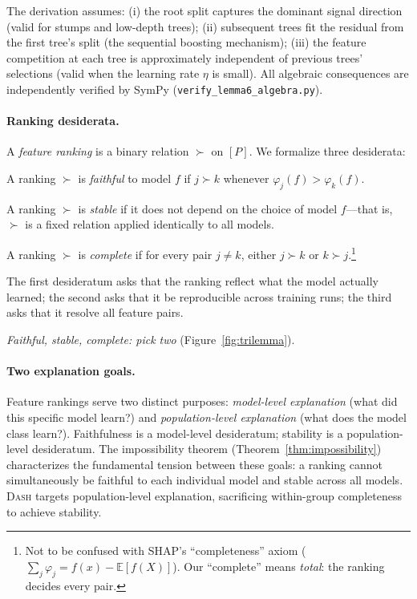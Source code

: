 \documentclass{jmlr}
\newcommand{\E}{\mathbb{E}}
\newcommand{\DASH}{\textsc{Dash}}
\begin{document}
The derivation assumes: (i) the root split captures the dominant signal direction (valid for stumps and low-depth trees); (ii) subsequent trees fit the residual from the first tree's split (the sequential boosting mechanism); (iii) the feature competition at each tree is approximately independent of previous trees' selections (valid when the learning rate $\eta$ is small). All algebraic consequences are independently verified by SymPy (\texttt{verify\_lemma6\_algebra.py}).

\paragraph{Ranking desiderata.}
A \emph{feature ranking} is a binary relation $\succ$ on $[P]$.
We formalize three desiderata:

\begin{definition}[Faithful]
\label{def:faithful}
A ranking $\succ$ is \emph{faithful} to model $f$ if $j \succ k$ whenever $\varphi_j(f) > \varphi_k(f)$.
\end{definition}

\begin{definition}[Stable]
\label{def:stable}
A ranking $\succ$ is \emph{stable} if it does not depend on the choice of model $f$---that is, $\succ$ is a fixed relation applied identically to all models.
\end{definition}

\begin{definition}[Complete]
\label{def:complete}
A ranking $\succ$ is \emph{complete} if for every pair $j \neq k$, either $j \succ k$ or $k \succ j$.\footnote{Not to be confused with SHAP's ``completeness'' axiom ($\sum_j \varphi_j = f(x) - \E[f(X)]$). Our ``complete'' means \emph{total}: the ranking decides every pair.}
\end{definition}

The first desideratum asks that the ranking reflect what the model actually learned; the second asks that it be reproducible across training runs; the third asks that it resolve all feature pairs.

\emph{Faithful, stable, complete: pick two} (Figure~\ref{fig:trilemma}).

\paragraph{Two explanation goals.}
Feature rankings serve two distinct purposes: \emph{model-level explanation} (what did this specific model learn?) and \emph{population-level explanation} (what does the model class learn?).
Faithfulness is a model-level desideratum; stability is a population-level desideratum.
The impossibility theorem (Theorem~\ref{thm:impossibility}) characterizes the fundamental tension between these goals: a ranking cannot simultaneously be faithful to each individual model and stable across all models.
\DASH{} targets population-level explanation, sacrificing within-group completeness to achieve stability.
\end{document}
